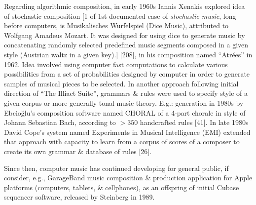 \documentclass{article}
\begin{document}
\begin{itemize}
\begin{itemize}
\begin{itemize}
			Regarding algorithmic composition, in early 1960s {\sc Iannis Xenakis} explored idea of stochastic composition [1 of 1st documented case of {\it stochastic music}, long before computers, is Musikalisches Wurfelspiel (Dice Music), attributed to {\sc Wolfgang Amadeus Mozart}. It was designed for using dice to generate music by concatenating randomly selected predefined music segments composed in a given style (Austrian waltz in a given key).] [208], in his composition named ``Atr\'ees'' in 1962. Idea involved using computer fast computations to calculate various possibilities from a set of probabilities designed by computer in order to generate samples of musical pieces to be selected. In another approach following initial direction of ``The Illiact Suite'', grammars \& rules were used to specify style of a given corpus or more generally tonal music theory. E.g.: generation in 1980s by {\sc Ebcioğlu}'s composition software named CHORAL of a 4-part chorale in style of {\sc Johann Sebastian Bach}, according to $> 350$ handcrafted rules [41]. In late 1980s {\sc David Cope}'s system named Experiments in Musical Intelligence (EMI) extended that approach with capacity to learn from a corpus of scores of a composer to create its own grammar \& database of rules [26].
			
			Since then, computer music has continued developing for general public, if consider, e.g., GarageBand music composition \& production application for Apple platforms (computers, tablets, \& cellphones), as an offspring of initial Cubase sequencer software, released by {\sc Steinberg} in 1989.
			

\end{itemize}
\end{itemize}
\end{itemize}
\end{document}
